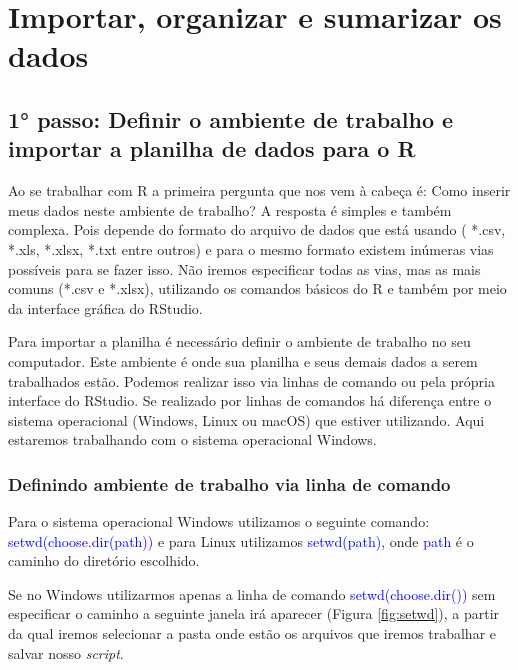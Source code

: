 \documentclass[14pt,titlepage, oneside, openany, a4paper]{book}
\begin{document}
\hypertarget{importar-organizar-e-sumarizar-os-dados}{%
\chapter{Importar, organizar e sumarizar os dados}\label{importar-organizar-e-sumarizar-os-dados}}

\hypertarget{passo-definir-o-ambiente-de-trabalho-e-importar-a-planilha-de-dados-para-o-r}{%
\section{1° passo: Definir o ambiente de trabalho e importar a planilha de dados para o R}\label{passo-definir-o-ambiente-de-trabalho-e-importar-a-planilha-de-dados-para-o-r}}

Ao se trabalhar com R a primeira pergunta que nos vem à cabeça é: Como inserir meus dados neste ambiente de trabalho? A resposta é simples e também complexa. Pois depende do formato do arquivo de dados que está usando ( *.csv, *.xls, *.xlsx, *.txt entre outros) e para o mesmo formato existem inúmeras vias possíveis para se fazer isso. Não iremos especificar todas as vias, mas as mais comuns (*.csv e *.xlsx), utilizando os comandos básicos do R e também por meio da interface gráfica do RStudio.

Para importar a planilha é necessário definir o ambiente de trabalho no seu computador. Este ambiente é onde sua planilha e seus demais dados a serem trabalhados estão. Podemos realizar isso via linhas de comando ou pela própria interface do RStudio. Se realizado por linhas de comandos há diferença entre o sistema operacional (Windows, Linux ou macOS) que estiver utilizando. Aqui estaremos trabalhando com o sistema operacional Windows.

\hypertarget{definindo-ambiente-de-trabalho-via-linha-de-comando}{%
\subsection{Definindo ambiente de trabalho via linha de comando}\label{definindo-ambiente-de-trabalho-via-linha-de-comando}}

Para o sistema operacional Windows utilizamos o seguinte comando: \textcolor{blue}{setwd(choose.dir(path))} e para Linux utilizamos \textcolor{blue}{setwd(path)}, onde \textcolor{blue}{path} é o caminho do diretório escolhido.

Se no Windows utilizarmos apenas a linha de comando \textcolor{blue}{setwd(choose.dir())} sem especificar o caminho a seguinte janela irá aparecer (Figura \ref{fig:setwd}), a partir da qual iremos selecionar a pasta onde estão os arquivos que iremos trabalhar e salvar nosso \emph{script}.
\end{document}
